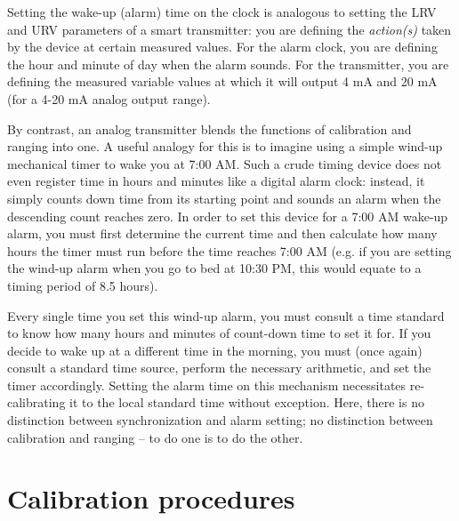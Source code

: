 Setting the wake-up (alarm) time on the clock is analogous to setting the LRV and URV parameters of a smart transmitter: you are defining the \textit{action(s)} taken by the device at certain measured values.  For the alarm clock, you are defining the hour and minute of day when the alarm sounds.  For the transmitter, you are defining the measured variable values at which it will output 4 mA and 20 mA (for a 4-20 mA analog output range).

\vskip 10pt

By contrast, an analog transmitter blends the functions of calibration and ranging into one.  A useful analogy for this is to imagine using a simple wind-up mechanical timer to wake you at 7:00 AM.  Such a crude timing device does not even register time in hours and minutes like a digital alarm clock: instead, it simply counts down time from its starting point and sounds an alarm when the descending count reaches zero.  In order to set this device for a 7:00 AM wake-up alarm, you must first determine the current time and then calculate how many hours the timer must run before the time reaches 7:00 AM (e.g. if you are setting the wind-up alarm when you go to bed at 10:30 PM, this would equate to a timing period of 8.5 hours).

Every single time you set this wind-up alarm, you must consult a time standard to know how many hours and minutes of count-down time to set it for.  If you decide to wake up at a different time in the morning, you must (once again) consult a standard time source, perform the necessary arithmetic, and set the timer accordingly.  Setting the alarm time on this mechanism necessitates re-calibrating it to the local standard time without exception.  Here, there is no distinction between synchronization and alarm setting; no distinction between calibration and ranging -- to do one is to do the other.









\filbreak
\section{Calibration procedures}

